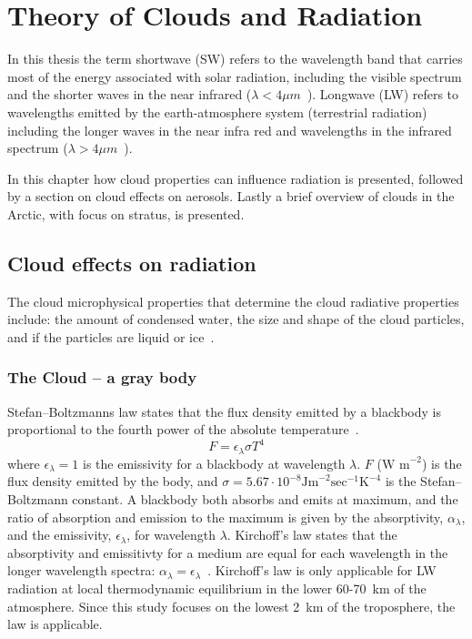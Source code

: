 \chapter{Theory of Clouds and Radiation}%
\label{chap:theory}
In this thesis the term shortwave (SW) refers to the wavelength band that carries most of the energy associated with solar radiation, including the visible spectrum and the shorter waves in the near infrared ($\lambda < 4\mu m$~\citep{Wallace2006}). Longwave (LW) refers to wavelengths emitted by the earth-atmosphere system (terrestrial radiation) including the longer waves in the near infra red and wavelengths in the infrared spectrum ($\lambda > 4\mu m$~\citep{Wallace2006}). 

In this chapter how cloud properties can influence radiation is presented, followed by a section on cloud effects on aerosols. Lastly a brief overview of clouds in the Arctic, with focus on stratus, is presented. 


\section{Cloud effects on radiation}
The cloud microphysical properties that determine the cloud radiative properties include: the amount of condensed water, the size and shape of the cloud particles, and if the particles are liquid or ice~\citep{Curry1996}.

\subsection{The Cloud -- a gray body}
Stefan–Boltzmanns law states that the flux density emitted by a blackbody is proportional to the fourth power of the absolute temperature~\citep{Liou2002}. 
\begin{equation}
F = \epsilon_{\lambda} \sigma T^4
\label{eqn:stefanboltzmann}
\end{equation}
where $\epsilon_{\lambda} = 1$ is the emissivity for a blackbody at wavelength $\lambda$. $F$ ($\text{W~m}^{-2}$) is the flux density emitted  by the body, and $\sigma = 5.67\cdot 10^{-8} \text{Jm}^{-2}\text{sec}^{-1}\text{K}^{-4}$ is the Stefan–Boltzmann constant. A blackbody both absorbs and emits at maximum, and the ratio of absorption and emission to the maximum is given by the absorptivity, $\alpha_{\lambda}$, and the emissivity, $\epsilon_{\lambda}$, for wavelength $\lambda$. Kirchoff's law states that the absorptivity and emissitivty for a medium are equal for each wavelength in the longer wavelength spectra: $\alpha_{\lambda} = \epsilon_{\lambda}$~\citep{Liou2002}. Kirchoff's law is only applicable for LW radiation at local thermodynamic equilibrium in the lower 60-70~km of the atmosphere. Since this study focuses on the lowest 2~km of the troposphere, the law is applicable.

